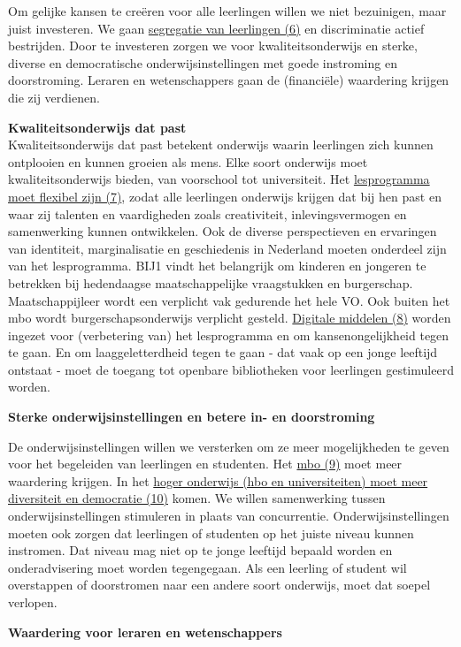 Om gelijke kansen te creëren voor alle leerlingen willen we niet
bezuinigen, maar juist investeren. We gaan \underline{segregatie van
leerlingen (6)} en discriminatie actief bestrijden. Door te investeren
zorgen we voor kwaliteitsonderwijs en sterke, diverse en democratische
onderwijsinstellingen met goede instroming en doorstroming. Leraren en
wetenschappers gaan de (financiële) waardering krijgen die zij
verdienen.

\textbf{Kwaliteitsonderwijs dat past}\\
Kwaliteitsonderwijs dat past betekent onderwijs waarin leerlingen zich
kunnen ontplooien en kunnen groeien als mens. Elke soort onderwijs moet
kwaliteitsonderwijs bieden, van voorschool tot universiteit. Het
\underline{lesprogramma moet flexibel zijn (7)}, zodat alle leerlingen
onderwijs krijgen dat bij hen past en waar zij talenten en vaardigheden
zoals creativiteit, inlevingsvermogen en samenwerking kunnen
ontwikkelen. Ook de diverse perspectieven en ervaringen van identiteit,
marginalisatie en geschiedenis in Nederland moeten onderdeel zijn van
het lesprogramma. BIJ1 vindt het belangrijk om kinderen en jongeren te
betrekken bij hedendaagse maatschappelijke vraagstukken en burgerschap.
Maatschappijleer wordt een verplicht vak gedurende het hele VO. Ook
buiten het mbo wordt burgerschapsonderwijs verplicht gesteld.
\underline{Digitale middelen (8)} worden ingezet voor (verbetering van)
het lesprogramma en om kansenongelijkheid tegen te gaan. En om
laaggeletterdheid tegen te gaan - dat vaak op een jonge leeftijd
ontstaat - moet de toegang tot openbare bibliotheken voor leerlingen
gestimuleerd worden.

\textbf{Sterke onderwijsinstellingen en betere in- en doorstroming}

De onderwijsinstellingen willen we versterken om ze meer mogelijkheden
te geven voor het begeleiden van leerlingen en studenten. Het
\underline{mbo (9)} moet meer waardering krijgen. In het
\underline{hoger onderwijs (hbo en universiteiten) moet meer diversiteit
en democratie (10)} komen. We willen samenwerking tussen
onderwijsinstellingen stimuleren in plaats van concurrentie.
Onderwijsinstellingen moeten ook zorgen dat leerlingen of studenten op
het juiste niveau kunnen instromen. Dat niveau mag niet op te jonge
leeftijd bepaald worden en onderadvisering moet worden tegengegaan. Als
een leerling of student wil overstappen of doorstromen naar een andere
soort onderwijs, moet dat soepel verlopen.

\textbf{Waardering voor leraren en wetenschappers}

